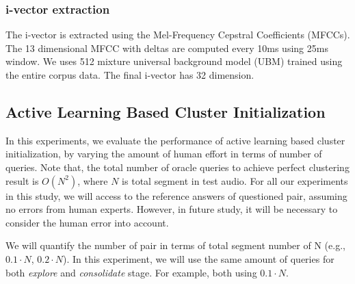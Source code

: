 \documentclass[journal]{IEEEtran}
\begin{document}
\subsubsection{i-vector extraction}
The i-vector is extracted using the Mel-Frequency Cepstral Coefficients (MFCCs). The 13 dimensional MFCC with deltas are computed every 10ms using 25ms window. We uses 512 mixture universal background model (UBM) trained using the entire corpus data. The final i-vector has 32 dimension. 

\subsection{Active Learning Based Cluster Initialization}
In this experiments, we evaluate the performance of active learning based cluster initialization, by varying the amount of human effort in terms of number of queries. Note that, the total number of oracle queries to achieve perfect clustering result is $O(N^2)$, where $N$ is total segment in test audio.
For all our experiments in this study, we will access to the reference answers of questioned pair, assuming no errors from human experts. However, in future study, it will be necessary to consider the human error into account.

We will quantify the number of pair in terms of total segment number of N (e.g., $0.1 \cdot N$, $0.2 \cdot N$). In this experiment, we will use the same amount of queries for both \textit{explore} and \textit{consolidate} stage. For example, both using $0.1 \cdot N$.
\end{document}
